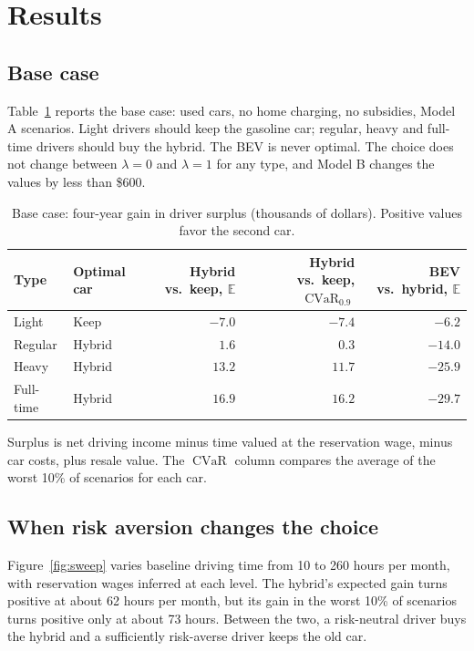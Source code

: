 \documentclass[11pt]{article}
\newcommand{\E}{\mathbb{E}}
\newcommand{\CVaR}{\operatorname{CVaR}}
\begin{document}
\section{Results}\label{sec:results}

\subsection{Base case}

Table~\ref{tab:base} reports the base case: used cars, no home charging, no subsidies, Model A scenarios. Light drivers should keep the gasoline car; regular, heavy and full-time drivers should buy the hybrid. The BEV is never optimal. The choice does not change between $\lambda = 0$ and $\lambda = 1$ for any type, and Model B changes the values by less than \$600.

\begin{table}[ht]
\centering
\caption{Base case: four-year gain in driver surplus (thousands of dollars). Positive values favor the second car.}\label{tab:base}
\small
\begin{threeparttable}
\begin{tabular}{@{}llrrr@{}}
\toprule
Type & Optimal car & Hybrid vs.\ keep, $\E$ & Hybrid vs.\ keep, $\CVaR_{0.9}$ & BEV vs.\ hybrid, $\E$ \\
\midrule
Light & Keep & $-7.0$ & $-7.4$ & $-6.2$ \\
Regular & Hybrid & $1.6$ & $0.3$ & $-14.0$ \\
Heavy & Hybrid & $13.2$ & $11.7$ & $-25.9$ \\
Full-time & Hybrid & $16.9$ & $16.2$ & $-29.7$ \\
\bottomrule
\end{tabular}
\begin{tablenotes}\footnotesize
\item Surplus is net driving income minus time valued at the reservation wage, minus car costs, plus resale value. The $\CVaR$ column compares the average of the worst 10\% of scenarios for each car.
\end{tablenotes}
\end{threeparttable}
\end{table}

\subsection{When risk aversion changes the choice}

Figure~\ref{fig:sweep} varies baseline driving time from 10 to 260 hours per month, with reservation wages inferred at each level. The hybrid's expected gain turns positive at about 62 hours per month, but its gain in the worst 10\% of scenarios turns positive only at about 73 hours. Between the two, a risk-neutral driver buys the hybrid and a sufficiently risk-averse driver keeps the old car.
\end{document}
